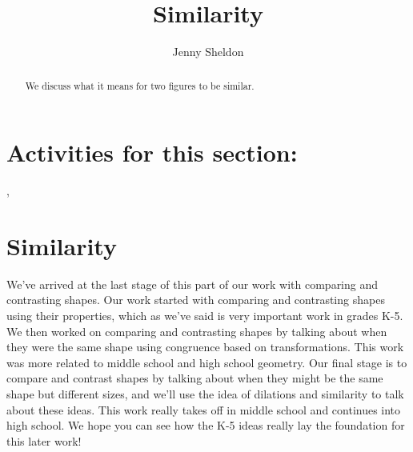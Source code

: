 \documentclass{ximera}
\title{Similarity}
\author{Jenny Sheldon}
\begin{document}
\begin{abstract}
We discuss what it means for two figures to be similar.
\end{abstract}
\maketitle

\section{Activities for this section:} 
, 


\section{Similarity}

We've arrived at the last stage of this part of our work with comparing and contrasting shapes. Our work started with comparing and contrasting shapes using their properties, which as we've said is very important work in grades K-5. We then worked on comparing and contrasting shapes by talking about when they were the same shape using congruence based on transformations. This work was more related to middle school and high school geometry. Our final stage is to compare and contrast shapes by talking about when they might be the same shape but different sizes, and we'll use the idea of dilations and similarity to talk about these ideas. This work really takes off in middle school and continues into high school. We hope you can see how the K-5 ideas really lay the foundation for this later work!
\end{document}
